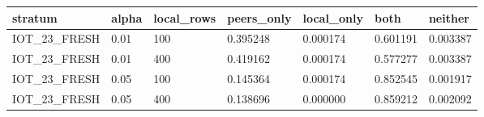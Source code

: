 \begin{tabular}{lllllll}
\toprule
stratum & alpha & local\_rows & peers\_only & local\_only & both & neither \\
\midrule
IOT\_23\_FRESH & 0.01 & 100 & 0.395248 & 0.000174 & 0.601191 & 0.003387 \\
IOT\_23\_FRESH & 0.01 & 400 & 0.419162 & 0.000174 & 0.577277 & 0.003387 \\
IOT\_23\_FRESH & 0.05 & 100 & 0.145364 & 0.000174 & 0.852545 & 0.001917 \\
IOT\_23\_FRESH & 0.05 & 400 & 0.138696 & 0.000000 & 0.859212 & 0.002092 \\
\bottomrule
\end{tabular}
